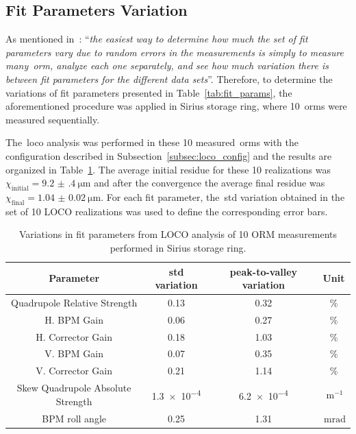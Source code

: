 \subsection{Fit Parameters Variation}\label{subsec:fit_var}
As mentioned in~\cite{safranek1997}: ``\textit{the easiest way to determine how much the set of fit parameters vary due to random errors in the measurements is simply to measure many~\gls{orm}, analyze each one separately, and see how much variation there is between fit parameters for the different data sets}''. Therefore, to determine the variations of fit parameters presented in Table~\ref{tab:fit_params}, the aforementioned procedure was applied in Sirius storage ring, where 10~\glspl{orm} were measured sequentially. 

The~\gls{loco} analysis was performed in these 10 measured~\glspl{orm} with the configuration described in Subsection~\ref{subsec:loco_config} and the results are organized in Table~\ref{tab:fit_var}. The average initial residue for these 10 realizations was $\chi_{\mathrm{initial}} = \SI{9.2(4)}{\micro\meter}$ and after the convergence the average final residue was $\chi_{\mathrm{final}} = \SI{1.04(2)}{\micro\meter}$. For each fit parameter, the~\gls{std} variation obtained in the set of 10 LOCO realizations was used to define the corresponding error bars.
\begin{table}
    \centering
    \caption{Variations in fit parameters from LOCO analysis of 10 ORM measurements performed in Sirius storage ring.}
    \label{tab:fit_var}
    \begin{tabular}{cccc}
        \toprule\toprule
        Parameter & std variation & peak-to-valley variation & Unit \\
        \hline
        Quadrupole Relative Strength     & 0.13 & 0.32 & \% \\  
        H. BPM Gain             & 0.06 & 0.27 & \%\\
        H. Corrector Gain       & 0.18 & 1.03 & \%\\
        V. BPM  Gain             & 0.07 & 0.35 & \%\\
        V. Corrector Gain       & 0.21 & 1.14 & \%\\
        Skew Quadrupole Absolute Strength& \num{1.3e-4} & \num{6.2e-4} & $\SI{}{\meter^{-1}}$\\
        BPM roll angle                & 0.25 & 1.31 & $\SI{}{\milli\radian}$ \\
        \bottomrule\bottomrule
    \end{tabular}
\end{table}

